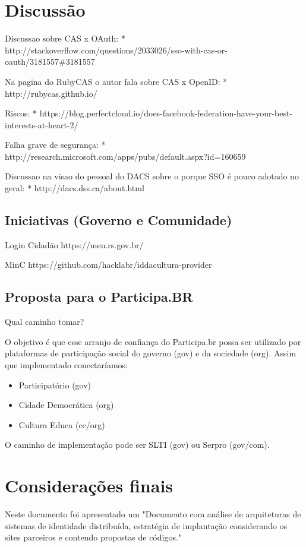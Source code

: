 \documentclass[11pt]{article}
\newcommand{\ProductDescription}{"Documento com análise de arquiteturas de
        sistemas de identidade distribuída, estratégia de implantação
        considerando os sites parceiros e contendo propostas de códigos."
}
\begin{document}
\section{Discussão}

Discussao sobre CAS x OAuth:
* http://stackoverflow.com/questions/2033026/sso-with-cas-or-oauth/3181557\#3181557

Na pagina do RubyCAS o autor fala sobre CAS x OpenID:
* http://rubycas.github.io/

Riscos:
* https://blog.perfectcloud.io/does-facebook-federation-have-your-best-interests-at-heart-2/

Falha grave de segurança:
* http://research.microsoft.com/apps/pubs/default.aspx?id=160659

Discussao na visao do pessoal do DACS sobre o porque SSO é pouco adotado no
geral:
* http://dacs.dss.ca/about.html

\subsection{Iniciativas (Governo e Comunidade)}

Login Cidadão
https://meu.rs.gov.br/

MinC
https://github.com/hacklabr/iddacultura-provider

\subsection{Proposta para o Participa.BR}

Qual caminho tomar?

O objetivo é que esse arranjo de confiança do Participa.br possa ser utilizado
por plataformas de participação social do governo (gov) e da sociedade (org).
Assim que implementado conectaríamos:

\begin{itemize}
  \item{Participatório (gov)}
  \item{Cidade Democrática (org)}
  \item{Cultura Educa (cc/org)}
\end{itemize}

O caminho de implementação pode ser SLTI (gov) ou Serpro (gov/com).

\section{Considerações finais}

Neste documento foi apresentado um \ProductDescription
\end{document}
